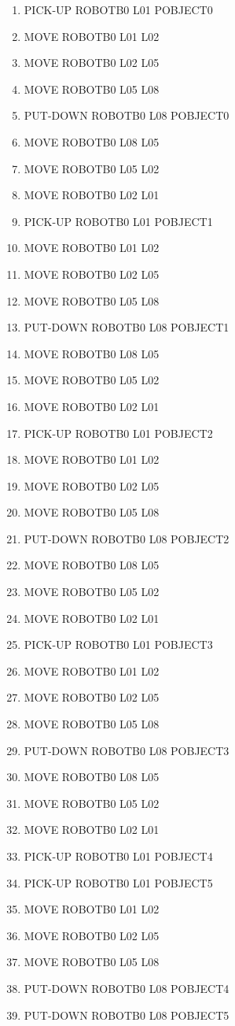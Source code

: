\documentclass{article}
\begin{document}
\begin{enumerate}
    \item PICK-UP ROBOTB0 L01 POBJECT0
    \item MOVE ROBOTB0 L01 L02
    \item MOVE ROBOTB0 L02 L05
    \item MOVE ROBOTB0 L05 L08
    \item PUT-DOWN ROBOTB0 L08 POBJECT0
    \item MOVE ROBOTB0 L08 L05
    \item MOVE ROBOTB0 L05 L02
    \item MOVE ROBOTB0 L02 L01
    \item PICK-UP ROBOTB0 L01 POBJECT1
    \item MOVE ROBOTB0 L01 L02
    \item MOVE ROBOTB0 L02 L05
    \item MOVE ROBOTB0 L05 L08
    \item PUT-DOWN ROBOTB0 L08 POBJECT1
    \item MOVE ROBOTB0 L08 L05
    \item MOVE ROBOTB0 L05 L02
    \item MOVE ROBOTB0 L02 L01
    \item PICK-UP ROBOTB0 L01 POBJECT2
    \item MOVE ROBOTB0 L01 L02
    \item MOVE ROBOTB0 L02 L05
    \item MOVE ROBOTB0 L05 L08
    \item PUT-DOWN ROBOTB0 L08 POBJECT2
    \item MOVE ROBOTB0 L08 L05
    \item MOVE ROBOTB0 L05 L02
    \item MOVE ROBOTB0 L02 L01
    \item PICK-UP ROBOTB0 L01 POBJECT3
    \item MOVE ROBOTB0 L01 L02
    \item MOVE ROBOTB0 L02 L05
    \item MOVE ROBOTB0 L05 L08
    \item PUT-DOWN ROBOTB0 L08 POBJECT3
    \item MOVE ROBOTB0 L08 L05
    \item MOVE ROBOTB0 L05 L02
    \item MOVE ROBOTB0 L02 L01
    \item PICK-UP ROBOTB0 L01 POBJECT4
    \item PICK-UP ROBOTB0 L01 POBJECT5
    \item MOVE ROBOTB0 L01 L02
    \item MOVE ROBOTB0 L02 L05
    \item MOVE ROBOTB0 L05 L08
    \item PUT-DOWN ROBOTB0 L08 POBJECT4
    \item PUT-DOWN ROBOTB0 L08 POBJECT5
\end{enumerate}
\end{document}
